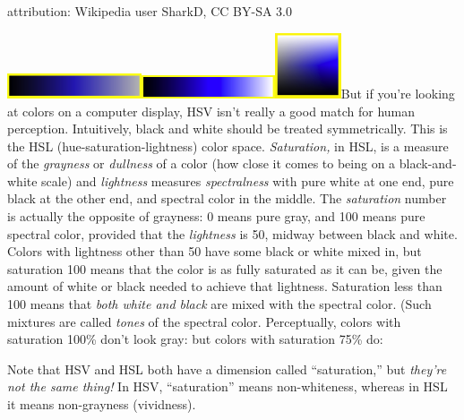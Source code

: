 attribution: Wikipedia user SharkD, CC BY-SA 3.0

\includegraphics[width=1.56389in,height=0.29306in]{media/image1201.png}\includegraphics[width=1.55556in,height=0.26597in]{media/image1202.png}\includegraphics[width=0.76389in,height=0.76389in]{media/image1203.png}But
if you're looking at colors on a computer display, HSV isn't really a
good match for human perception. Intuitively, black and white should be
treated symmetrically. This is the HSL (hue-saturation-lightness) color
space. \emph{Saturation,} in HSL, is a measure of the \emph{grayness} or
\emph{dullness} of a color (how close it comes to being on a
black-and-white scale) and \emph{lightness} measures \emph{spectralness}
with pure white at one end, pure black at the other end, and spectral
color in the middle. The \emph{saturation} number is actually the
opposite of grayness: 0 means pure gray, and 100 means pure spectral
color, provided that the \emph{lightness} is 50, midway between black
and white. Colors with lightness other than 50 have some black or white
mixed in, but saturation 100 means that the color is as fully saturated
as it can be, given the amount of white or black needed to achieve that
lightness. Saturation less than 100 means that \emph{both white and
black} are mixed with the spectral color. (Such mixtures are called
\emph{tones} of the spectral color. Perceptually, colors with saturation
100\% don't look gray: but colors with saturation 75\% do:

Note that HSV and HSL both have a dimension called ``saturation,'' but
\emph{they're not the same thing!} In HSV, ``saturation'' means
non-whiteness, whereas in HSL it means non-grayness (vividness).

